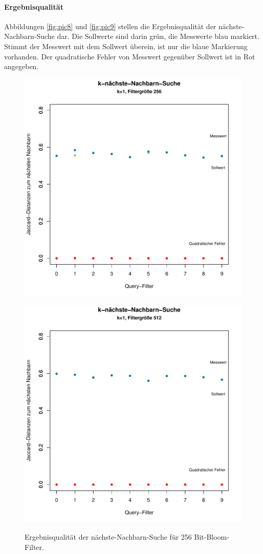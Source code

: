 \paragraph*{Ergebnisqualität}
Abbildungen \ref{fig:pic8} und \ref{fig:pic9} stellen die Ergebnisqualität der nächste-Nachbarn-Suche dar. Die Sollwerte sind darin grün, die Messwerte blau markiert. Stimmt der Messwert mit dem Sollwert überein, ist nur die blaue Markierung vorhanden. Der quadratische Fehler von Messwert gegenüber Sollwert ist in Rot angegeben. 
\begin{figure}[hpbt]
	\centering
 	\includegraphics[scale=0.7]{pictures/nn_256.pdf}\\
  	\caption[Ergebnisqualität der nächste-Nachbarn-Suche für 256 Bit-Bloom-Filter]{Ergebnisqualität der nächste-Nachbarn-Suche für 256 Bit-Bloom-Filter.}\label{fig:pic7}
 	\includegraphics[scale=0.7]{pictures/nn_512.pdf}\\

\end{figure}
